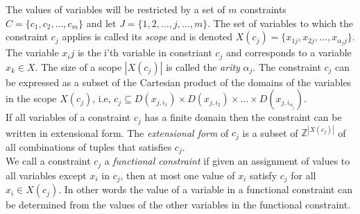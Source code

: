 The values of variables will be restricted by a set of $m$ constraints $C= \{ c_1,c_2, \dots , c_m \} $ and let $J = 
\{1,2,\dots,j,\dots , m\}$. The set of 
variables to which the constraint $c_j$ applies is called its \emph{scope} and is denoted 
$X(c_j) = \{x_{1j}, x_{2j} , \dots , x_{\alpha_jj}\}$. The variable $x_ij$ is the i'th variable in constriant $c_j$ 
and corresponds to a variable $x_k\in X$.  
The size of a scope $|X(c_j)|$ is called the \emph{arity} $\alpha_j$. The constraint $c_j$ can be expressed as a 
subset of the Cartesian product of the domains of the variables in the scope $X(c_j)$, i.e, $c_j \subseteq 
D(x_{j,i_1}) \times D(x_{j,i_2}) \times \dots \times D(x_{j,i_{\alpha_j}})$. \\ 
If all variables of a constraint $c_j$ has a finite domain then the constraint can be written in extensional form. The 
\emph{extensional form} of $c_j$ is a subset of $\mathbb{Z}^{|X(c_j)|}$ of all combinations of tuples that satisfies 
$c_j$.  \\ 
We call a constraint $c_j$ a \emph{functional constraint} if given an assignment of values to all variables except 
$x_i$ in $c_j$, then at most one value of $x_i$ satisfy $c_j$ for all $x_i \in X(c_j)$. In other words the value of a 
variable in a functional constraint can be determined from the values of the other variables in the functional 
constraint. 

\iffalse
